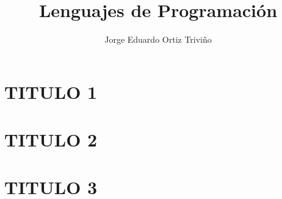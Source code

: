\documentclass[krantz1,ChapterTOCs]{krantz}
\begin{document}
\frontmatter

\title{Lenguajes de Programación 
}
\author{Jorge Eduardo Ortiz Triviño}

\maketitle

%
\setcounter{page}{1} %
\tableofcontents
%
%
\listoffigures
%
%

\mainmatter
\part{TITULO 1}


\part{TITULO 2}





\part{TITULO 3}







\printindex
\end{document}
